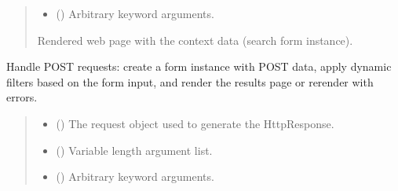 \documentclass[letterpaper,10pt,english]{sphinxmanual}
\begin{document}
\begin{fulllineitems}
\begin{fulllineitems}
\begin{quote}
\begin{description}
\begin{itemize}
\item {} 
\sphinxAtStartPar
{} () \textendash{} Arbitrary keyword arguments.

\end{itemize}

\sphinxAtStartPar
{} \textendash{} Rendered web page with the context data (search form instance).

\end{description}\end{quote}

\end{fulllineitems}


\begin{fulllineitems}
\label{\detokenize{source/meta_models_management:meta_models_management.views.SmartSearch.post}}
\pysigstartsignatures
{}
\pysigstopsignatures
\sphinxAtStartPar
Handle POST requests: create a form instance with POST data,
apply dynamic filters based on the form input, and render the results page or re\sphinxhyphen{}render with errors.
\begin{quote}\begin{description}
\begin{itemize}
\item {} 
\sphinxAtStartPar
{} () \textendash{} The request object used to generate the HttpResponse.

\item {} 
\sphinxAtStartPar
{} () \textendash{} Variable length argument list.

\item {} 
\sphinxAtStartPar
{} () \textendash{} Arbitrary keyword arguments.


\end{itemize}
\end{description}
\end{quote}
\end{fulllineitems}
\end{fulllineitems}
\end{document}
